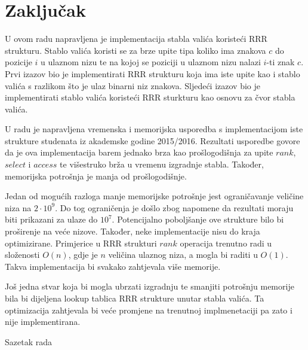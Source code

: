 \documentclass[times, utf8, seminar, numeric]{fer}
\begin{document}
\chapter{Zaključak}

U ovom radu napravljena je implementacija stabla valića koristeći RRR strukturu. Stablo valića koristi se za brze upite tipa koliko ima znakova $c$ do pozicije $i$ u ulaznom nizu te na kojoj se poziciji u ulaznom nizu nalazi $i$-ti znak $c$. Prvi izazov bio je implementirati RRR strukturu koja ima iste upite kao i stablo valića s razlikom što je ulaz binarni niz znakova. Sljedeći izazov bio je implementirati stablo valića koristeći RRR sturkturu kao osnovu za čvor stabla valića. 

U radu je napravljena vremenska i memorijska usporedba s implementacijom iste strukture studenata iz akademske godine 2015/2016. Rezultati usporedbe govore da je ova implementacija barem jednako brza kao prošlogodišnja za upite $rank$, $select$ i $access$ te višestruko brža u vremenu izgradnje stabla. Također, memorijska potrošnja je manja od prošlogodišnje.

Jedan od mogućih razloga manje memorijske potrošnje jest ograničavanje veličine niza na $2 \cdot 10^9$. Do tog ograničenja je došlo zbog napomene da rezultati moraju biti prikazani za ulaze do $10^7$. Potencijalno poboljšanje ove strukture bilo bi proširenje na veće nizove. Također, neke implementacije nisu do kraja optimizirane. Primjerice u RRR strukturi $rank$ operacija trenutno radi u složenosti $O(n)$, gdje je $n$ veličina ulaznog niza, a mogla bi raditi u $O(1)$. Takva implementacija bi svakako zahtjevala više memorije. 

Još jedna stvar koja bi mogla ubrzati izgradnju te smanjiti potrošnju memorije bila bi dijeljena lookup tablica RRR strukture unutar stabla valića. Ta optimizacija zahtjevala bi veće promjene na trenutnoj implmenetaciji pa zato i nije implementirana. 

 




\begin{sazetak}
Sazetak rada

\end{sazetak}
\end{document}
